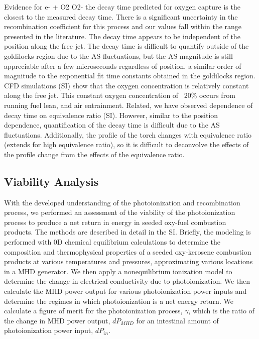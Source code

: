 \begin{outline}
    
\1 Evidence for e- + O2 \rightarrow O2-
    \2 the decay time predicted for oxygen capture is the closest to the measured decay time. There is a significant uncertainty in the recombination coefficient for this process and our values fall within the range presented in the literature. 
    \2 The decay time appears to be independent of the position along the free jet. The decay time is difficult to quantify outside of the goldilocks region due to the AS fluctuations, but the AS magnitude is still appreciable after a few microseconds regardless of position. a similar order of magnitude to the exponential fit time constants obtained in the goldilocks region. CFD simulations (SI) show that the oxygen concentration is relatively constant along the free jet. This constant oxygen concentration of ~20\% occurs from running fuel lean, and air entrainment. 
    \2 Related, we have observed dependence of decay time on equivalence ratio (SI). However, similar to the position dependence, quantification of the decay time is difficult due to the AS fluctuations. Additionally, the profile of the torch changes with equivalence ratio (extends for high equivalence ratio), so it is difficult to deconvolve the effects of the profile change from the effects of the equivalence ratio.
\end{outline}



\subsection{Viability Analysis}

With the developed understanding of the photoionization and recombination process, we performed an assessment of the viability of the photoionization process to produce a net return in energy in seeded oxy-fuel combustion products. The methods are described in detail in the SI. Briefly, the modeling is performed with 0D chemical equilibrium calculations to determine the composition and thermophysical properties of a seeded oxy-kerosene combustion products at various temperatures and pressures, approximating various locations in a MHD generator. We then apply a nonequilibrium ionization model to determine the change in electrical conductivity due to photoionization. We then calculate the MHD power output for various photoionization power inputs and determine the regimes in which photoionization is a net energy return. We calculate a figure of merit for the photoionization process, $\gamma$, which is the ratio of the change in MHD power output, $dP_{MHD}$ for an intestinal amount of photoionization power input, $dP_{in}$. 


